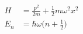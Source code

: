 

\vspace*{\fill}
\centering

\begin{align*}
    H &= \frac{p^2}{2m} + \frac{1}{2}m\omega^2x^2 \\
    E_{n} &= \hbar\omega\Big(n + \frac{1}{2}\Big)
\end{align*}

\centering
\vspace*{\fill}

